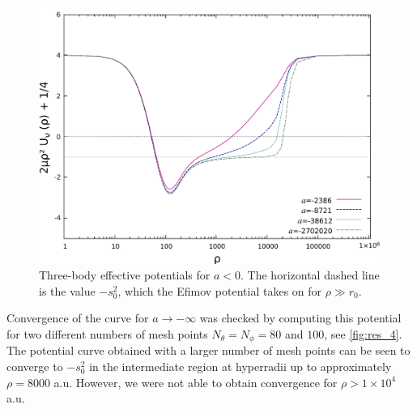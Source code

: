 \begin{figure}
	\includegraphics[width=\linewidth]{plotneg_dashed.pdf}
	\caption{Three-body effective potentials for $a<0$. The horizontal dashed line is the value $-s_0^2$, which the Efimov potential takes on for $\rho\gg r_0$.}
	\label{fig:res_3}
\end{figure}
Convergence of the curve for $a \rightarrow -\infty$ was checked by computing this potential for two different numbers of mesh points $N_{\theta}=N_{\phi}=80$ and $100$, see \cref{fig:res_4}. The potential curve obtained with a larger number of mesh points can be seen to converge to $-s_0^2$ in the intermediate region at hyperradii up to approximately $\rho=8000$ a.u. However, we were not able to obtain convergence for $\rho>1 \times 10^4$ a.u. 

